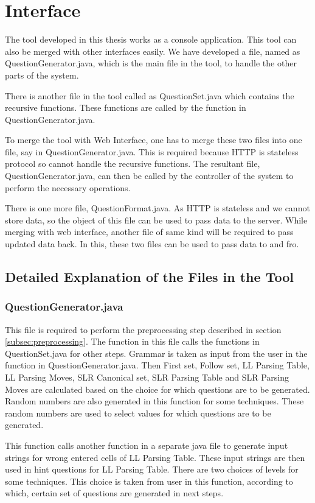 \chapter{Interface}
\label{chap:interface}

The tool developed in this thesis works as a console application. This tool can also be merged with other interfaces easily. We have developed a file, named as QuestionGenerator.java, which is the main file in the tool, to handle the other parts of the system.

There is another file in the tool called as QuestionSet.java which contains the recursive functions. These functions are called by the function in QuestionGenerator.java.

To merge the tool with Web Interface, one has to merge these two files into one file, say in QuestionGenerator.java. This is required because  HTTP is stateless protocol so cannot handle the recursive functions. The resultant file, QuestionGenerator.java, can then be called by the controller of the system to perform the necessary operations.

There is one more file, QuestionFormat.java. As HTTP is stateless and we cannot store data, so the object of this file can be used to pass data to the server. While merging with web interface, another file of same kind will be required to pass updated data back. In this, these two files can be used to pass data to and fro.

\section{Detailed Explanation of the Files in the Tool}
\subsection{QuestionGenerator.java}
This file is required to perform the preprocessing step described in section \ref{subsec:preprocessing}. The function in this file calls the functions in QuestionSet.java for other steps. Grammar is taken as input from the user in the function in QuestionGenerator.java. Then First set, Follow set, LL Parsing Table, LL Parsing Moves, SLR Canonical set, SLR Parsing Table and SLR Parsing Moves are calculated based on the choice for which questions are to be generated. Random numbers are also generated in this function for some techniques. These random numbers are used to select values for which questions are to be generated.

This function calls another function in a separate java file to generate input strings for wrong entered cells of LL Parsing Table. These input strings are then used in hint questions for LL Parsing Table. There are two choices of levels for some techniques. This choice is taken from user in this function, according to which, certain set of questions are generated in next steps.

